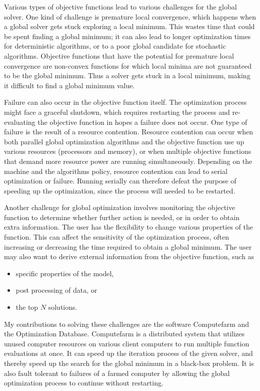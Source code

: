 Various types of objective functions lead to various challenges for the global solver. One kind of challenge is premature local convergence, which happens when a global solver gets stuck exploring a local minimum. This wastes time that could be spent finding a global minimum; it can also lead to longer optimization times for deterministic algorithms, or to a poor global candidate for stochastic algorithms. Objective functions that have the potential for premature local convergence are non-convex functions for which local minima are not guaranteed to be the global minimum. Thus a solver gets stuck in a local minimum, making it difficult to find a global minimum value. 

Failure can also occur in the objective function itself. The optimization process might face a graceful shutdown, which requires restarting the process and re-evaluating the objective function in hopes a failure does not occur. One type of failure is the result of a resource contention. Resource contention can occur when both parallel global optimization algorithms and the objective function use up various resources (processors and memory), or when multiple objective functions that demand more resource power are running simultaneously. Depending on the machine and the algorithms policy, resource contention can lead to serial optimization or failure. Running serially can therefore defeat the purpose of speeding up the optimization, since the process will needed to be restarted. 

Another challenge for global optimization involves monitoring the objective function to determine whether further action is needed, or in order to obtain extra information. The user has the flexibility to change various properties of the function. This can affect the sensitivity of the optimization process, often increasing or decreasing the time required to obtain a global minimum. The user may also want to derive external information from the objective function, such as 
\begin{itemize}
  \item specific properties of the model, 
  \item post processing of data, or
  \item the top $N$ solutions.
\end{itemize}

My contributions to solving these challenges are the software Computefarm and the Optimization Database. Computefarm is a distributed system that utilizes unused computer resources on various client computers to run multiple function evaluations at once. It can speed up the iteration process of the given solver, and thereby speed up the search for the global minimum in a black-box problem. It is also fault tolerant to failures of a farmed computer by allowing the global optimization process to continue without restarting. 

